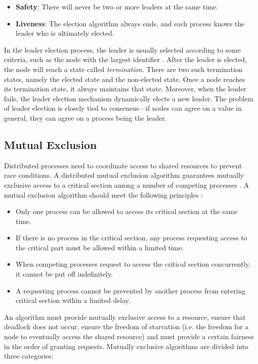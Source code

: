 \documentclass[12pt, a4paper]{article}
\begin{document}
\begin{itemize}
  \item \textbf{Safety}: There will never be two or more leaders at the same time.
  \item \textbf{Liveness}: The election algorithm always ends, and each process knows the leader who is ultimately elected.
\end{itemize}

In the leader election process, the leader is usually selected according to some criteria, such as the node with the largest identifier  \cite{effatparvar2010improved}. After the leader is elected, the node will reach a state called \textit{termination}. There are two such termination states, namely the elected state and the non-elected state. Once a node reaches its termination state, it always maintains that state. Moreover, when the leader fails, the leader election mechanism dynamically elects a new leader. The problem of leader election is closely tied to consensus---if nodes can agree on a value in general, they can agree on a process being the leader.

\subsection{Mutual Exclusion}
Distributed processes need to coordinate access to shared resources to prevent race conditions. A distributed mutual exclusion algorithm guarantees mutually exclusive access to a critical section among a number of competing processes \cite{lamport1987fast}. A mutual exclusion algorithm should meet the following principles \cite{velazques1993survey}:

\begin{itemize}
  \item Only one process can be allowed to access its critical section at the same time.
  \item If there is no process in the critical section, any process requesting access to the critical part must be allowed within a limited time.
  \item When competing processes request to access the critical section concurrently, it cannot be put off indefinitely.
  \item A requesting process cannot be prevented by another process
  from entering critical section within a limited delay.
\end{itemize}

An algorithm must provide mutually exclusive access to a resource, ensure that deadlock does not occur, ensure the freedom of starvation (i.e. the freedom for a node to eventually access the shared resource) and must provide a certain fairness in the order of granting requests. Mutually exclusive algorithms are divided into three categories:
\end{document}
